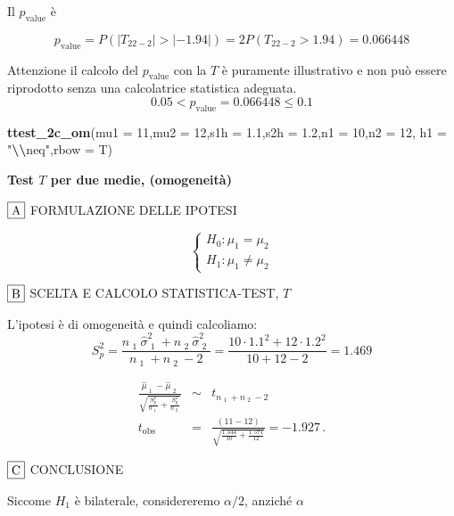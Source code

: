 \documentclass[
  11pt,
]{book}
\newenvironment{Shaded}{\begin{snugshade}}{\end{snugshade}}
\newcommand{\AttributeTok}[1]{\textcolor[rgb]{0.13,0.29,0.53}{#1}}
\newcommand{\DecValTok}[1]{\textcolor[rgb]{0.00,0.00,0.81}{#1}}
\newcommand{\FloatTok}[1]{\textcolor[rgb]{0.00,0.00,0.81}{#1}}
\newcommand{\FunctionTok}[1]{\textcolor[rgb]{0.13,0.29,0.53}{\textbf{#1}}}
\newcommand{\NormalTok}[1]{#1}
\newcommand{\SpecialCharTok}[1]{\textcolor[rgb]{0.81,0.36,0.00}{\textbf{#1}}}
\newcommand{\StringTok}[1]{\textcolor[rgb]{0.31,0.60,0.02}{#1}}
\theoremstyle{mytheoremstyle}
\theoremstyle{mydefstyle}
\begin{document}
Il \(p_{\text{value}}\) è

\[ p_{\text{value}} = P(|T_{22-2}|>|-1.94|)=2P(T_{22-2}>1.94)=0.066448 \]

Attenzione il calcolo del \(p_\text{value}\) con la \(T\) è puramente illustrativo e non può essere riprodotto senza una calcolatrice statistica adeguata.\[
 0.05 < p_\text{value}= 0.066448 \leq 0.1 
\]

\begin{Shaded}
\begin{Highlighting}[]
\FunctionTok{ttest\_2c\_om}\NormalTok{(}\AttributeTok{mu1 =} \DecValTok{11}\NormalTok{,}\AttributeTok{mu2 =} \DecValTok{12}\NormalTok{,}\AttributeTok{s1h =} \FloatTok{1.1}\NormalTok{,}\AttributeTok{s2h =} \FloatTok{1.2}\NormalTok{,}\AttributeTok{n1 =} \DecValTok{10}\NormalTok{,}\AttributeTok{n2 =} \DecValTok{12}\NormalTok{,}
                \AttributeTok{h1 =} \StringTok{"}\SpecialCharTok{\textbackslash{}\textbackslash{}}\StringTok{neq"}\NormalTok{,}\AttributeTok{rbow =}\NormalTok{ T)}
\end{Highlighting}
\end{Shaded}

\textbf{Test \(T\) per due medie, (omogeneità)}

\(\fbox{A}\) FORMULAZIONE DELLE IPOTESI

\[\begin{cases}
   H_0: \mu_\text{1} = \mu_\text{2} \\
   H_1: \mu_\text{1} \neq \mu_\text{2} 
   \end{cases}\]

\(\fbox{B}\) SCELTA E CALCOLO STATISTICA-TEST, \(T\)

L'ipotesi è di omogeneità e quindi calcoliamo:\[
   S_p^2=\frac{n_\text{ 1 }\hat\sigma^2_\text{ 1 }+n_\text{ 2 }\hat\sigma^2_\text{ 2 }}{n_\text{ 1 }+n_\text{ 2 }-2} =
   \frac{ 10 \cdot 1.1 ^2+ 12 \cdot 1.2 ^2}{ 10 + 12 -2}= 1.469 
  \]

\begin{eqnarray*}
  \frac{\hat\mu_\text{ 1 } - \hat\mu_\text{ 2 }}
  {\sqrt{\frac {S^2_p}{n_\text{ 1 }}+\frac {S^2_p}{n_\text{ 2 }}}}&\sim&t_{n_\text{ 1 }+n_\text{ 2 }-2}\\
  t_{\text{obs}}
  &=& \frac{ ( 11 -  12 )} {\sqrt{\frac{ 1.344 }{ 10 }+\frac{ 1.571 }{ 12 }}}
  =   -1.927 \, .
  \end{eqnarray*}

\(\fbox{C}\) CONCLUSIONE

Siccome \(H_1\) è bilaterale, considereremo \(\alpha/2\),
anziché \(\alpha\)
\end{document}
